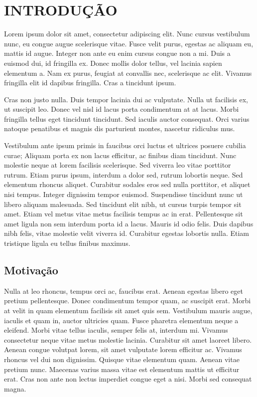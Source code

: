  \chapter{INTRODUÇÃO}
\label{cap:introducao}

Lorem ipsum dolor sit amet, consectetur adipiscing elit. Nunc cursus vestibulum nunc, eu congue augue scelerisque vitae. Fusce velit purus, egestas ac aliquam eu, mattis id augue. Integer non ante eu enim cursus congue non a mi. Duis a euismod dui, id fringilla ex. Donec mollis dolor tellus, vel lacinia sapien elementum a. Nam ex purus, feugiat at convallis nec, scelerisque ac elit. Vivamus fringilla elit id dapibus fringilla. Cras a tincidunt ipsum.

Cras non justo nulla. Duis tempor lacinia dui ac vulputate. Nulla ut facilisis ex, ut suscipit leo. Donec vel nisl id lacus porta condimentum at at lacus. Morbi fringilla tellus eget tincidunt tincidunt. Sed iaculis auctor consequat. Orci varius natoque penatibus et magnis dis parturient montes, nascetur ridiculus mus.

Vestibulum ante ipsum primis in faucibus orci luctus et ultrices posuere cubilia curae; Aliquam porta ex non lacus efficitur, ac finibus diam tincidunt. Nunc molestie neque at lorem facilisis scelerisque. Sed viverra leo vitae porttitor rutrum. Etiam purus ipsum, interdum a dolor sed, rutrum lobortis neque. Sed elementum rhoncus aliquet. Curabitur sodales eros sed nulla porttitor, et aliquet nisi tempus. Integer dignissim tempor euismod. Suspendisse tincidunt nunc ut libero aliquam malesuada. Sed tincidunt elit nibh, ut cursus turpis tempor sit amet. Etiam vel metus vitae metus facilisis tempus ac in erat. Pellentesque sit amet ligula non sem interdum porta id a lacus. Mauris id odio felis. Duis dapibus nibh felis, vitae molestie velit viverra id. Curabitur egestas lobortis nulla. Etiam tristique ligula eu tellus finibus maximus.

\section{Motivação}

Nulla at leo rhoncus, tempus orci ac, faucibus erat. Aenean egestas libero eget pretium pellentesque. Donec condimentum tempor quam, ac suscipit erat. Morbi at velit in quam elementum facilisis sit amet quis sem. Vestibulum mauris augue, iaculis et quam in, auctor ultricies quam. Fusce pharetra elementum neque a eleifend. Morbi vitae tellus iaculis, semper felis at, interdum mi. Vivamus consectetur neque vitae metus molestie lacinia. Curabitur sit amet laoreet libero. Aenean congue volutpat lorem, sit amet vulputate lorem efficitur ac. Vivamus rhoncus vel dui non dignissim. Quisque vitae elementum quam. Aenean vitae pretium nunc. Maecenas varius massa vitae est elementum mattis ut efficitur erat. Cras non ante non lectus imperdiet congue eget a nisi. Morbi sed consequat magna.

